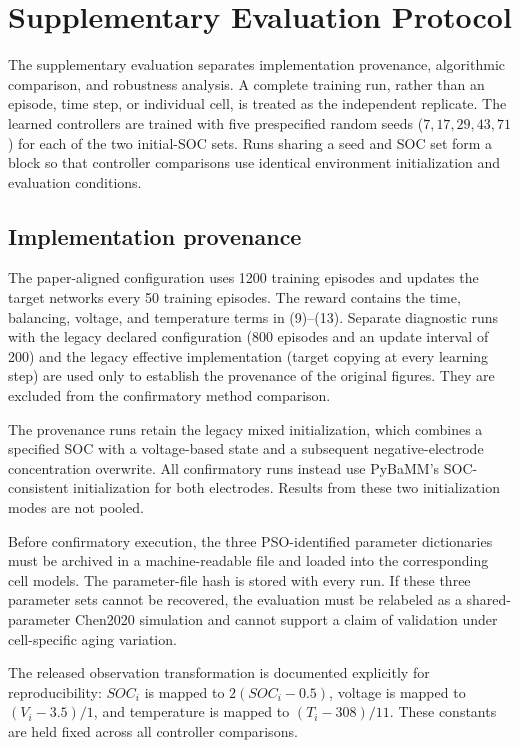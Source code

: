 \section{Supplementary Evaluation Protocol}
\label{sec:supplementary_protocol}

The supplementary evaluation separates implementation provenance, algorithmic
comparison, and robustness analysis. A complete training run, rather than an
episode, time step, or individual cell, is treated as the independent replicate.
The learned controllers are trained with five prespecified random seeds
($7,17,29,43,71$) for each of the two initial-SOC sets. Runs sharing a seed and
SOC set form a block so that controller comparisons use identical environment
initialization and evaluation conditions.

\subsection{Implementation provenance}

The paper-aligned configuration uses 1200 training episodes and updates the
target networks every 50 training episodes. The reward contains the time,
balancing, voltage, and temperature terms in (9)--(13). Separate diagnostic runs
with the legacy declared configuration (800 episodes and an update interval of
200) and the legacy effective implementation (target copying at every learning
step) are used only to establish the provenance of the original figures. They
are excluded from the confirmatory method comparison.

The provenance runs retain the legacy mixed initialization, which combines a
specified SOC with a voltage-based state and a subsequent negative-electrode
concentration overwrite. All confirmatory runs instead use PyBaMM's
SOC-consistent initialization for both electrodes. Results from these two
initialization modes are not pooled.

Before confirmatory execution, the three PSO-identified parameter dictionaries
must be archived in a machine-readable file and loaded into the corresponding
cell models. The parameter-file hash is stored with every run. If these three
parameter sets cannot be recovered, the evaluation must be relabeled as a
shared-parameter Chen2020 simulation and cannot support a claim of validation
under cell-specific aging variation.

The released observation transformation is documented explicitly for
reproducibility: $SOC_i$ is mapped to $2(SOC_i-0.5)$, voltage is mapped to
$(V_i-3.5)/1$, and temperature is mapped to $(T_i-308)/11$. These constants are
held fixed across all controller comparisons.

